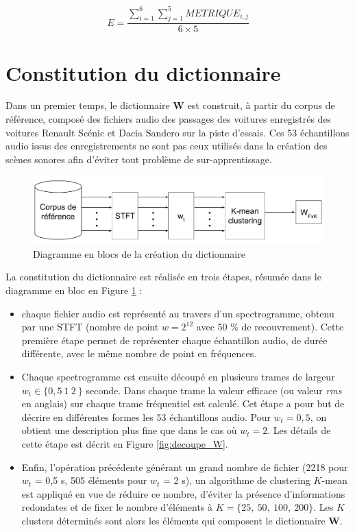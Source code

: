 \begin{equation}
E = \frac{\sum_{i = 1}^6 \sum_{j = 1}^5 METRIQUE_{i,j}}{6 \times 5}
\end{equation}



\section{Constitution du dictionnaire}
Dans un premier temps, le dictionnaire $\mathbf{W}$ est construit, à partir du corpus de référence, composé des fichiers audio des passages des voitures enregistrés des voitures Renault Scénic et Dacia Sandero sur la piste d'essais. Ces 53 échantillons audio issus des enregistrements ne sont pas ceux utilisés dans la création des scènes sonores afin d'éviter tout problème de sur-apprentissage.

\begin{figure}[hbtp]
\centering
\includegraphics[width=.9\linewidth]{./figures/NMF/creation_dictionaire.pdf}
\caption{Diagramme en blocs de la création du dictionnaire}
\label{fig:creation_W}
\end{figure}


La constitution du dictionnaire est réalisée en trois étapes, résumée dans le diagramme en bloc en Figure \ref{fig:creation_W} : 
\begin{itemize}
\item chaque fichier audio est représenté au travers d'un spectrogramme, obtenu par une STFT (nombre de point $w = 2^{12}$ avec 50 $\%$ de recouvrement). Cette première étape permet de représenter chaque échantillon audio, de durée différente, avec le même nombre de point en fréquences.
\item Chaque spectrogramme est ensuite découpé en plusieurs trames de largeur $w_t \in \lbrace 0,5~ 1~ 2~\rbrace$ seconde. Dans chaque trame la valeur efficace (ou valeur \textit{rms} en anglais) sur chaque trame fréquentiel est calculé. Cet étape a pour but de décrire en différentes formes les 53 échantillons audio. Pour $w_t = 0,5$, on obtient une description plus fine que dans le cas où $w_t = 2$. Les détails de cette étape est décrit en Figure \ref{fig:decoupe_W}.
\item Enfin, l'opération précédente générant un grand nombre de fichier (2218 pour $w_t$ = 0,5 s, 505 éléments pour $w_t$ = 2 s), un algorithme de clustering $K$-mean est appliqué en vue de réduire ce nombre, d'éviter la présence d'informations redondates et de fixer le nombre d'éléments à $K = \lbrace 25,~50,~100,~200 \rbrace$. Les $K$ clusters déterminés sont alors les éléments qui composent le dictionnaire $\mathbf{W}$.
\end{itemize}

